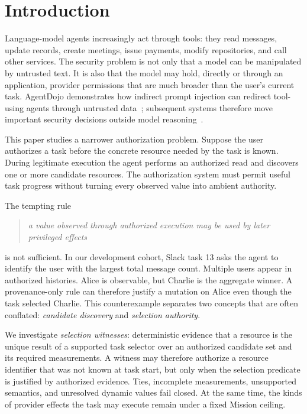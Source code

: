\documentclass[5p,times,twocolumn]{elsarticle}
\begin{document}
\section{Introduction}
\label{sec:introduction}

Language-model agents increasingly act through tools: they read messages, update records, create meetings, issue payments, modify repositories, and call other services. The security problem is not only that a model can be manipulated by untrusted text. It is also that the model may hold, directly or through an application, provider permissions that are much broader than the user's current task. AgentDojo demonstrates how indirect prompt injection can redirect tool-using agents through untrusted data~\cite{debenedetti2024agentdojo}; subsequent systems therefore move important security decisions outside model reasoning~\cite{debenedetti2025camel,shi2025progent,costa2025fides}.

This paper studies a narrower authorization problem. Suppose the user authorizes a task before the concrete resource needed by the task is known. During legitimate execution the agent performs an authorized read and discovers one or more candidate resources. The authorization system must permit useful task progress without turning every observed value into ambient authority.

The tempting rule
\begin{quote}
\emph{a value observed through authorized execution may be used by later privileged effects}
\end{quote}
is not sufficient. In our development cohort, Slack task 13 asks the agent to identify the user with the largest total message count. Multiple users appear in authorized histories. Alice is observable, but Charlie is the aggregate winner. A provenance-only rule can therefore justify a mutation on Alice even though the task selected Charlie. This counterexample separates two concepts that are often conflated: \emph{candidate discovery} and \emph{selection authority}.

We investigate \emph{selection witnesses}: deterministic evidence that a resource is the unique result of a supported task selector over an authorized candidate set and its required measurements. A witness may therefore authorize a resource identifier that was not known at task start, but only when the selection predicate is justified by authorized evidence. Ties, incomplete measurements, unsupported semantics, and unresolved dynamic values fail closed. At the same time, the kinds of provider effects the task may execute remain under a fixed Mission ceiling.
\end{document}
